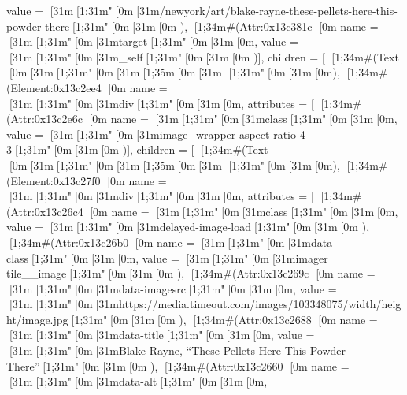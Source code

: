 {{{{{{{                          value = [31m[1;31m"[0m[31m/newyork/art/blake-rayne-these-pellets-here-this-powder-there[1;31m"[0m[31m[0m
                          }),
                        [1;34m#(Attr:0x13c381c {[0m name = [31m[1;31m"[0m[31mtarget[1;31m"[0m[31m[0m, value = [31m[1;31m"[0m[31m_self[1;31m"[0m[31m[0m })],
                      children = [
                        [1;34m#(Text [0m[31m[1;31m"[0m[31m[1;35m\n[0m[31m                                    [1;31m"[0m[31m[0m),
                        [1;34m#(Element:0x13c2ee4 {[0m
                          name = [31m[1;31m"[0m[31mdiv[1;31m"[0m[31m[0m,
                          attributes = [
                            [1;34m#(Attr:0x13c2e6c {[0m
                              name = [31m[1;31m"[0m[31mclass[1;31m"[0m[31m[0m,
                              value = [31m[1;31m"[0m[31mimage_wrapper aspect-ratio-4-3[1;31m"[0m[31m[0m
                              })],
                          children = [
                            [1;34m#(Text [0m[31m[1;31m"[0m[31m[1;35m\n[0m[31m            [1;31m"[0m[31m[0m),
                            [1;34m#(Element:0x13c27f0 {[0m
                              name = [31m[1;31m"[0m[31mdiv[1;31m"[0m[31m[0m,
                              attributes = [
                                [1;34m#(Attr:0x13c26c4 {[0m name = [31m[1;31m"[0m[31mclass[1;31m"[0m[31m[0m, value = [31m[1;31m"[0m[31mdelayed-image-load[1;31m"[0m[31m[0m }),
                                [1;34m#(Attr:0x13c26b0 {[0m
                                  name = [31m[1;31m"[0m[31mdata-class[1;31m"[0m[31m[0m,
                                  value = [31m[1;31m"[0m[31mimager tile__image[1;31m"[0m[31m[0m
                                  }),
                                [1;34m#(Attr:0x13c269c {[0m
                                  name = [31m[1;31m"[0m[31mdata-imagesrc[1;31m"[0m[31m[0m,
                                  value = [31m[1;31m"[0m[31mhttps://media.timeout.com/images/103348075/{width}/{height}/image.jpg[1;31m"[0m[31m[0m
                                  }),
                                [1;34m#(Attr:0x13c2688 {[0m
                                  name = [31m[1;31m"[0m[31mdata-title[1;31m"[0m[31m[0m,
                                  value = [31m[1;31m"[0m[31mBlake Rayne, “These Pellets Here This Powder There”[1;31m"[0m[31m[0m
                                  }),
                                [1;34m#(Attr:0x13c2660 {[0m
                                  name = [31m[1;31m"[0m[31mdata-alt[1;31m"[0m[31m[0m,
}}}}}}}}}
